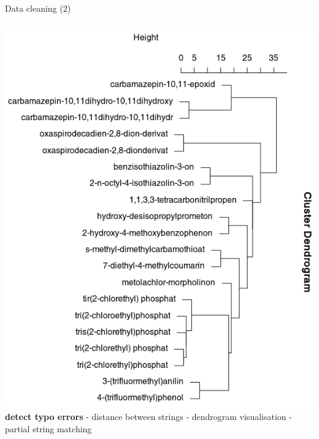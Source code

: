 \documentclass[8pt,ignorenonframetext,]{beamer}
\newcommand{\columnsbegin}{\begin{columns}}
\newcommand{\columnsend}{\end{columns}}
\begin{document}
\begin{frame}{Data cleaning (2)}

\columnsbegin
{}
\includegraphics{imgPres/data_cleaning_dendrogram.png}
 \textbf{detect typo errors} - distance between
strings - dendrogram visualisation - partial string matching \columnsend

\end{frame}
\end{document}
